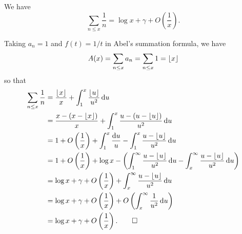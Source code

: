 \begin{thm}\label{thm:2.10}
We have 
\[ \sum_{n \leq x} \frac1n = \log x + \gamma + O
\left( \frac1x \right). \]
\end{thm}
\begin{pf}
Taking $a_n = 1$ and $f(t) = 1/t$ in Abel's summation formula,
we have 
\[ A(x) = \sum_{n\leq x} a_n = \sum_{n \leq x} 1 = \lfloor x\rfloor \]
so that 
\begin{align*}
    \sum_{n\leq x} \frac1n &= \frac{\lfloor x\rfloor}{x} + \int_1^x \frac{\lfloor u\rfloor}{u^2}\,\mathrm{d} u \\
    &= \frac{x - (x - \lfloor x\rfloor)}{x} + \int_1^x \frac{u - (u - \lfloor u\rfloor)}{u^2}\,\mathrm{d} u \\
    &= 1 + O\left(\frac1x\right) + \int_1^x \frac{{\rm d}u}u -
    \int_1^x \frac{u - \lfloor u\rfloor}{u^2}\,\mathrm{d} u \\
    &= 1 + O\left(\frac1x\right) + \log x - \left( \int_1^\infty \frac{u-\lfloor u\rfloor}{u^2}\,\mathrm{d} u - \int_x^\infty \frac{u-\lfloor u\rfloor}{u^2}\,\mathrm{d} u \right) \\
    &= \log x + \gamma + O\left(\frac1x\right) + 
    \int_x^\infty \frac{u-\lfloor u\rfloor}{u^2}\,\mathrm{d} u \\
    &= \log x + \gamma + O\left(\frac1x\right) 
    + O\left(\int_x^\infty \frac1{u^2}\,\mathrm{d} u \right) \\
    &= \log x + \gamma + O\left(\frac1x\right). \qedhere
\end{align*}
\end{pf}

